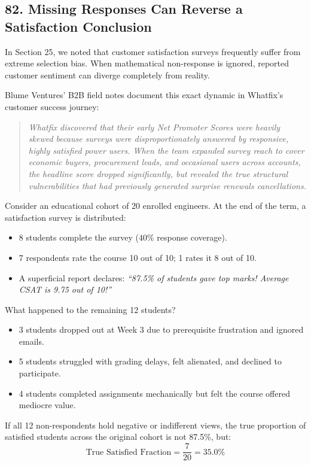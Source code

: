 \subsection*{82. Missing Responses Can Reverse a Satisfaction Conclusion}

In Section 25, we noted that customer satisfaction surveys frequently suffer from extreme selection bias. When mathematical non-response is ignored, reported customer sentiment can diverge completely from reality.

Blume Ventures' B2B field notes document this exact dynamic in Whatfix's customer success journey:
\begin{quote}
\textit{Whatfix discovered that their early Net Promoter Scores were heavily skewed because surveys were disproportionately answered by responsive, highly satisfied power users. When the team expanded survey reach to cover economic buyers, procurement leads, and occasional users across accounts, the headline score dropped significantly, but revealed the true structural vulnerabilities that had previously generated surprise renewals cancellations.}
\end{quote}
Consider an educational cohort of 20 enrolled engineers. At the end of the term, a satisfaction survey is distributed:
\begin{itemize}[leftmargin=*]
\item 8 students complete the survey ($40\%$ response coverage).
\item 7 respondents rate the course 10 out of 10; 1 rates it 8 out of 10.
\item A superficial report declares: \textit{``87.5\% of students gave top marks! Average CSAT is 9.75 out of 10!''}
\end{itemize}

What happened to the remaining 12 students?
\begin{itemize}[leftmargin=*]
\item 3 students dropped out at Week 3 due to prerequisite frustration and ignored emails.
\item 5 students struggled with grading delays, felt alienated, and declined to participate.
\item 4 students completed assignments mechanically but felt the course offered mediocre value.
\end{itemize}
If all 12 non-respondents hold negative or indifferent views, the true proportion of satisfied students across the original cohort is not 87.5\%, but:
\begin{equation}
\text{True Satisfied Fraction} = \frac{7}{20} = 35.0\%
\end{equation}

